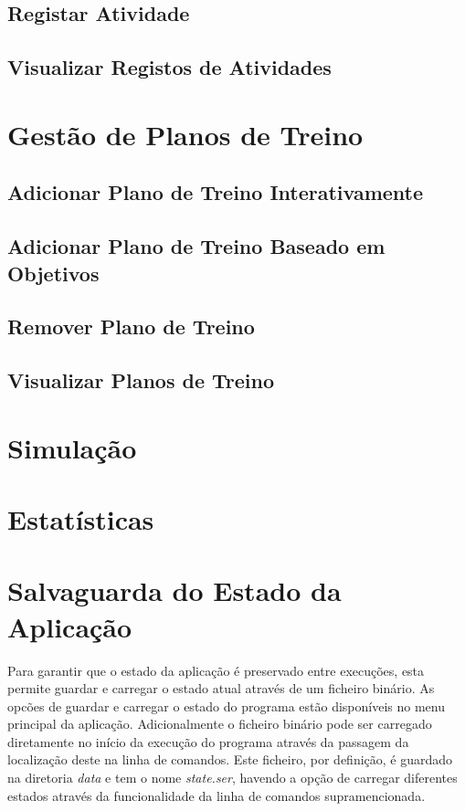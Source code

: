 \documentclass[a4paper,12pt]{scrreprt}
\begin{document}
    \subsection{Registar Atividade}
    \subsection{Visualizar Registos de Atividades}

\section{Gestão de Planos de Treino}
    \subsection{Adicionar Plano de Treino Interativamente}
    \subsection{Adicionar Plano de Treino Baseado em Objetivos}
    \subsection{Remover Plano de Treino}
    \subsection{Visualizar Planos de Treino}

\section{Simulação}

\section{Estatísticas}

\clearpage
\section{Salvaguarda do Estado da Aplicação}
Para garantir que o estado da aplicação é preservado entre execuções, esta
permite guardar e carregar o estado atual através de um ficheiro binário.
As opcões de guardar e carregar o estado do programa estão disponíveis no menu principal da aplicação. Adicionalmente o ficheiro binário pode ser carregado diretamente no início da execução do programa através da passagem da localização deste na linha de comandos.
Este ficheiro, por definição, é guardado na diretoria \textit{data} e tem o nome \textit{state.ser}, havendo a opção de carregar diferentes estados através da funcionalidade da linha de comandos supramencionada.
\end{document}
